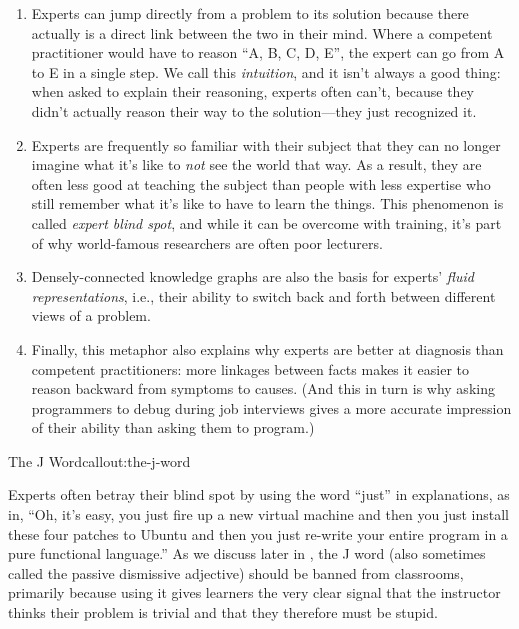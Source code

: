 \begin{enumerate}

\item
  Experts can jump directly from a problem to its solution because
  there actually is a direct link between the two in their mind.
  Where a competent practitioner would have to reason ``A, B, C, D,
  E'', the expert can go from A to E in a single step. We call
  this \emph{intuition}, and it isn't always a good thing: when asked
  to explain their reasoning, experts often can't, because they didn't
  actually reason their way to the solution---they just recognized it.

\item
  Experts are frequently so familiar with their subject that they can
  no longer imagine what it's like to \emph{not} see the world that
  way. As a result, they are often less good at teaching the subject
  than people with less expertise who still remember what it's like to
  have to learn the things. This phenomenon is called \emph{expert
  blind spot}, and while it can be overcome with training, it's part
  of why world-famous researchers are often poor lecturers.

\item
  Densely-connected knowledge graphs are also the basis for experts'
  \emph{fluid representations}, i.e., their ability to switch back
  and forth between different views of a problem.  

\item
  Finally, this metaphor also explains why experts are better at
  diagnosis than competent practitioners: more linkages between facts
  makes it easier to reason backward from symptoms to causes. (And
  this in turn is why asking programmers to debug during job
  interviews gives a more accurate impression of their ability than
  asking them to program.)

\end{enumerate}

\begin{callout}{The J Word}{callout:the-j-word}

Experts often betray their blind spot by using the word ``just'' in
explanations, as in, ``Oh, it's easy, you just fire up a new virtual
machine and then you just install these four patches to Ubuntu and
then you just re-write your entire program in a pure functional
language.'' As we discuss later in , the J word
(also sometimes called the passive dismissive adjective) should be
banned from classrooms, primarily because using it gives learners the
very clear signal that the instructor thinks their problem is trivial
and that they therefore must be stupid.

\end{callout}

